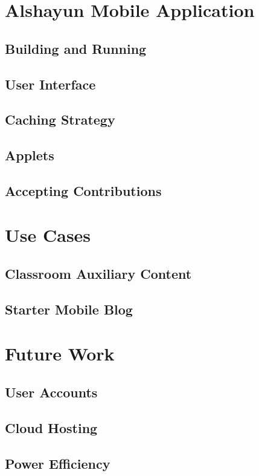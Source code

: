 \documentclass[12pt]{report}
\begin{document}
\chapter{Alshayun Mobile Application}
    \section{Building and Running}
    \section{User Interface}
    \section{Caching Strategy}
    \section{Applets}
    \section{Accepting Contributions}

\chapter{Use Cases}
    \section{Classroom Auxiliary Content}
    \section{Starter Mobile Blog}

\chapter{Future Work}
    \section{User Accounts}
    \section{Cloud Hosting}
    \section{Power Efficiency}
\end{document}
